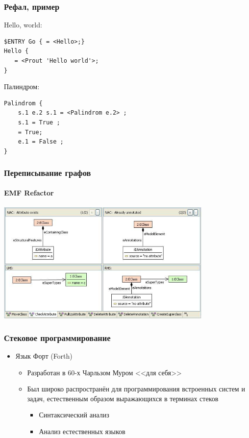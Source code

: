 \documentclass[xetex,mathserif,serif]{beamer}
\begin{document}
    \begin{frame}[fragile]
        \frametitle{Рефал, пример}
        Hello, world:
        \begin{verbatim}
$ENTRY Go { = <Hello>;}
Hello {
   = <Prout 'Hello world'>;
}
        \end{verbatim}
        \vspace{3mm}
        Палиндром:
        \begin{verbatim}
Palindrom {
    s.1 e.2 s.1 = <Palindrom e.2> ;
    s.1 = True ;
    = True;
    e.1 = False ;
}
        \end{verbatim}
    \end{frame}
    
    \begin{frame}
        \frametitle{Переписывание графов}
        \framesubtitle{EMF Refactor}
        \begin{center}
            \includegraphics[width=0.8\textwidth]{graphRewriting.png}
        \end{center}
    \end{frame}

    \begin{frame}
        \frametitle{Стековое программирование}
        \begin{itemize}
            \item Язык Форт (Forth)
            \begin{itemize}
                \item Разработан в 60-х Чарльзом Муром <<для себя>>
                \item Был широко распространён для программирования встроенных систем и задач, естественным образом выражающихся в терминах стеков
                \begin{itemize}
                    \item Синтаксический анализ
                    \item Анализ естественных языков
                \end{itemize}
            \end{itemize}
        \end{itemize}
    \end{frame}
\end{document}
